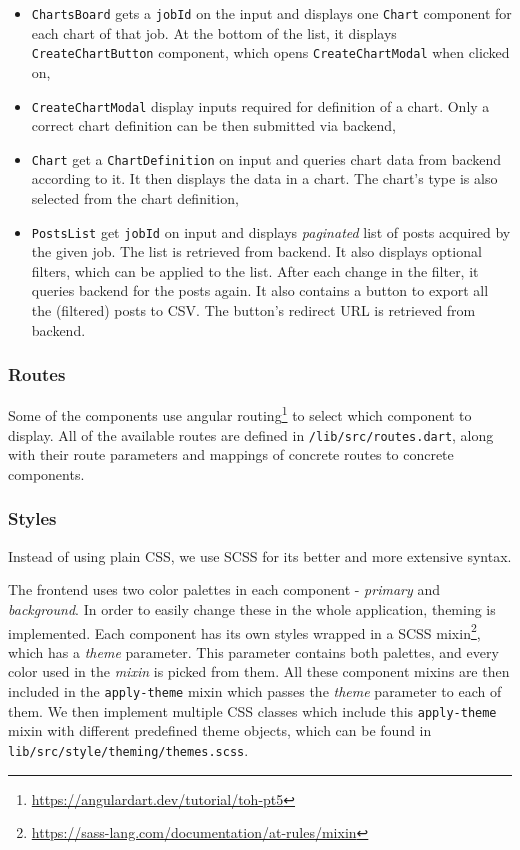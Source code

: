 \begin{itemize}
    \item \texttt{ChartsBoard} gets a \texttt{jobId} on the input and displays one \texttt{Chart} component for each chart of that job. At the bottom of the list, it displays \texttt{CreateChartButton} component, which opens \texttt{CreateChartModal} when clicked on,
    
    \item \texttt{CreateChartModal} display inputs required for definition of a chart. Only a correct chart definition can be then submitted via backend,
    
    \item \texttt{Chart} get a \texttt{ChartDefinition} on input and queries chart data from backend according to it. It then displays the data in a chart. The chart's type is also selected from the chart definition,
    
    \item \texttt{PostsList} get \texttt{jobId} on input and displays \textit{paginated} list of posts acquired by the given job. The list is retrieved from backend. It also displays optional filters, which can be applied to the list. After each change in the filter, it queries backend for the posts again. It also contains a button to export all the (filtered) posts to CSV. The button's redirect URL is retrieved from backend.
\end{itemize}

\subsubsection{Routes}
Some of the components use angular routing\footnote{\url{https://angulardart.dev/tutorial/toh-pt5}} to select which component to display. All of the available routes are defined in \texttt{/lib/src/routes.dart}, along with their route parameters and mappings of concrete routes to concrete components.

\subsubsection{Styles}
Instead of using plain CSS, we use SCSS for its better and more extensive syntax.

The frontend uses two color palettes in each component - \textit{primary} and \textit{background}. In order to easily change these in the whole application, theming is implemented. Each component has its own styles wrapped in a SCSS mixin\footnote{\url{https://sass-lang.com/documentation/at-rules/mixin}}, which has a \textit{theme} parameter. This parameter contains both palettes, and every color used in the \textit{mixin} is picked from them. All  these component mixins are then included in the \texttt{apply-theme} mixin which passes the \textit{theme} parameter to each of them. We then implement multiple CSS classes which include this \texttt{apply-theme} mixin with different predefined theme objects, which can be found in \texttt{lib/src/style/theming/themes.scss}.


